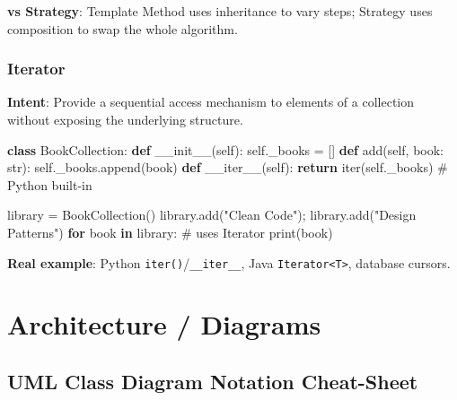 \documentclass[11pt]{article}
\newenvironment{Shaded}{\begin{snugshade}}{\end{snugshade}}
\newcommand{\BuiltInTok}[1]{\textcolor[rgb]{0.50,0.55,0.55}{#1}}
\newcommand{\CommentTok}[1]{\textcolor[rgb]{0.48,0.49,0.49}{#1}}
\newcommand{\ControlFlowTok}[1]{\textcolor[rgb]{0.99,0.74,0.29}{\textbf{#1}}}
\newcommand{\FunctionTok}[1]{\textcolor[rgb]{0.56,0.27,0.68}{#1}}
\newcommand{\KeywordTok}[1]{\textcolor[rgb]{0.81,0.81,0.76}{\textbf{#1}}}
\newcommand{\NormalTok}[1]{\textcolor[rgb]{0.81,0.81,0.76}{#1}}
\newcommand{\OperatorTok}[1]{\textcolor[rgb]{0.81,0.81,0.76}{#1}}
\newcommand{\StringTok}[1]{\textcolor[rgb]{0.96,0.31,0.31}{#1}}
\newcommand{\VariableTok}[1]{\textcolor[rgb]{0.15,0.68,0.68}{#1}}
\begin{document}
\textbf{vs Strategy}: Template Method uses inheritance to vary steps; Strategy uses composition to swap the whole algorithm.

\subsubsection{Iterator}\label{iterator}

\textbf{Intent}: Provide a sequential access mechanism to elements of a collection without exposing the underlying structure.


\begin{Shaded}
\begin{Highlighting}[]
\KeywordTok{class}\NormalTok{ BookCollection:}
    \KeywordTok{def} \FunctionTok{\_\_init\_\_}\NormalTok{(}\VariableTok{self}\NormalTok{): }\VariableTok{self}\NormalTok{.\_books }\OperatorTok{=}\NormalTok{ []}
    \KeywordTok{def}\NormalTok{ add(}\VariableTok{self}\NormalTok{, book: }\BuiltInTok{str}\NormalTok{): }\VariableTok{self}\NormalTok{.\_books.append(book)}
    \KeywordTok{def} \FunctionTok{\_\_iter\_\_}\NormalTok{(}\VariableTok{self}\NormalTok{): }\ControlFlowTok{return} \BuiltInTok{iter}\NormalTok{(}\VariableTok{self}\NormalTok{.\_books)   }\CommentTok{\# Python built{-}in}

\NormalTok{library }\OperatorTok{=}\NormalTok{ BookCollection()}
\NormalTok{library.add(}\StringTok{"Clean Code"}\NormalTok{)}\OperatorTok{;}\NormalTok{ library.add(}\StringTok{"Design Patterns"}\NormalTok{)}
\ControlFlowTok{for}\NormalTok{ book }\KeywordTok{in}\NormalTok{ library:   }\CommentTok{\# uses Iterator}
    \BuiltInTok{print}\NormalTok{(book)}
\end{Highlighting}
\end{Shaded}

\textbf{Real example}: Python \texttt{iter()}/\texttt{\_\_iter\_\_}, Java \texttt{Iterator\textless{}T\textgreater{}}, database cursors.

\section{Architecture / Diagrams}\label{architecture--diagrams}

\subsection{UML Class Diagram Notation Cheat-Sheet}\label{uml-class-diagram-notation-cheat-sheet}
\end{document}
